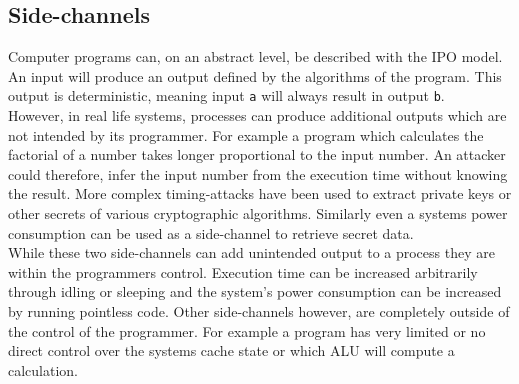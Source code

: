 \documentclass[conference,compsoc,final,a4paper]{IEEEtran}
\begin{document}
\subsection{Side-channels}
Computer programs can, on an abstract level, be described with the \ac{IPO} model. An input will produce an output defined by the algorithms
of the program. This output is deterministic, meaning input \lstinline|a| will always result in output \lstinline|b|. \\
However, in real life systems, processes can produce additional outputs which are not intended by its programmer. For example a program which calculates the
factorial of a number takes longer proportional to the input number. An attacker could therefore, infer the input number from the execution time without knowing the
result. More complex timing-attacks have been used to extract private keys or other secrets
of various cryptographic algorithms. \cite{bernstein2005cache}\cite{kocher1996timing}
Similarly even a systems power consumption can be used as a side-channel to retrieve secret data. \cite{kocher1999differential} \\
While these two side-channels can add unintended output to a process they are within the programmers control. Execution time can be increased arbitrarily through
idling or sleeping and the system's power consumption can be increased by running pointless code. Other side-channels however, are completely outside of the
control of the programmer. For example a program has very limited or no direct control over the systems cache state or which \ac{ALU} will compute a calculation.
\end{document}
